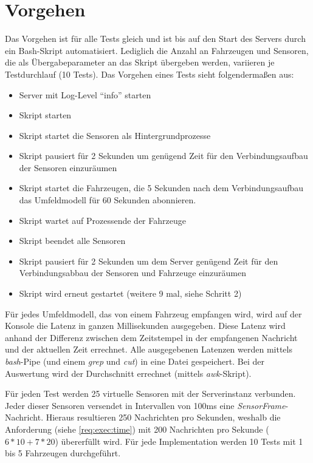 \section{Vorgehen}
\label{eval:howto}

Das Vorgehen ist für alle Tests gleich und ist bis auf den Start des Servers durch ein Bash-Skript automatisiert.
Lediglich die Anzahl an Fahrzeugen und Sensoren, die als Übergabeparameter an das Skript übergeben werden, variieren je Testdurchlauf (10 Tests).
Das Vorgehen eines Tests sieht folgendermaßen aus:

\begin{itemize}
	\item Server mit Log-Level \enquote{info} starten
	\item Skript starten
	\item Skript startet die Sensoren als Hintergrundprozesse
	\item Skript pausiert für 2 Sekunden um genügend Zeit für den Verbindungsaufbau der Sensoren einzuräumen
	\item Skript startet die Fahrzeugen, die 5 Sekunden nach dem Verbindungsaufbau das Umfeldmodell für 60 Sekunden abonnieren.
	\item Skript wartet auf Prozessende der Fahrzeuge
	\item Skript beendet alle Sensoren
	\item Skript pausiert für 2 Sekunden um dem Server genügend Zeit für den Verbindungsabbau der Sensoren und Fahrzeuge einzuräumen
	\item Skript wird erneut gestartet (weitere 9 mal, siehe Schritt 2)
\end{itemize}

Für jedes Umfeldmodell, das von einem Fahrzeug empfangen wird, wird auf der Konsole die Latenz in ganzen Millisekunden ausgegeben.
Diese Latenz wird anhand der Differenz zwischen dem Zeitstempel in der empfangenen Nachricht und der aktuellen Zeit errechnet.
Alle ausgegebenen Latenzen werden mittels \textit{bash}-Pipe (und einem \textit{grep} und \textit{cut}) in eine Datei gespeichert.
Bei der Auswertung wird der Durchschnitt errechnet (mittels \textit{awk}-Skript).

Für jeden Test werden 25 virtuelle Sensoren mit der Serverinstanz verbunden.
Jeder dieser Sensoren versendet in Intervallen von 100ms eine \textit{SensorFrame}-Nachricht.
Hieraus resultieren 250 Nachrichten pro Sekunden, weshalb die Anforderung  (siehe \autoref{req:exec:time}) mit 200 Nachrichten pro Sekunde ($6*10 + 7*20$) übererfüllt wird.
Für jede Implementation werden 10 Tests mit 1 bis 5 Fahrzeugen durchgeführt.

